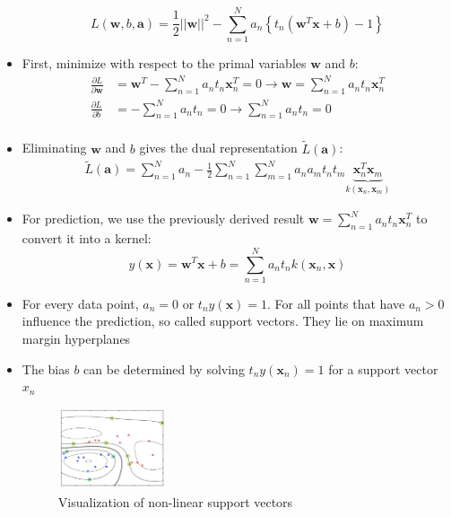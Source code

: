 \begin{itemize}
	$$L\left(\bm{w},b,\bm{a}\right) = \frac{1}{2}||\bm{w}||^2 - \sum\limits_{n=1}^{N} a_n \left\{t_n \left(\bm{w}^T \bm{x} + b\right) - 1\right\}$$
	\item First, minimize with respect to the primal variables $\bm{w}$ and $b$:
	\begin{equation*}
		\begin{split}
			\frac{\partial L}{\partial \bm{w}} & = \bm{w}^T - \sum\limits_{n=1}^{N} a_n t_n \bm{x}_n^T = 0\to \bm{w} = \sum\limits_{n=1}^{N}a_n t_n \bm{x}_n^T\\
			\frac{\partial L}{\partial b} & = - \sum\limits_{n=1}^{N} a_n t_n = 0\to \sum\limits_{n=1}^{N} a_n t_n = 0\\
		\end{split}
	\end{equation*}
	\item Eliminating $\bm{w}$ and $b$ gives the dual representation $\tilde{L}(\bm{a})$:
	\begin{equation*}
		\begin{split}
			\tilde{L}(\bm{a}) = \sum\limits_{n=1}^{N} a_n - \frac{1}{2} \sum\limits_{n=1}^{N}\sum\limits_{m=1}^{N} a_n a_m t_n t_m \underbrace{\bm{x}_n^T \bm{x}_m}_{k(\bm{x}_n, \bm{x}_m)}
		\end{split}
	\end{equation*}
	\item For prediction, we use the previously derived result $\bm{w} = \sum_{n=1}^{N}a_n t_n \bm{x}_n^T$ to convert it into a kernel:
	$$y(\bm{x})=\bm{w}^T \bm{x} + b = \sum_{n=1}^{N}a_n t_n k(\bm{x}_n, \bm{x})$$
	\item For every data point, $a_n = 0$ or $t_n y(\bm{x}) = 1$. For all points that have $a_n > 0$ influence the prediction, so called support vectors. They lie on maximum margin hyperplanes 
	\item The bias $b$ can be determined by solving $t_n y(\bm{x}_n) = 1$ for a support vector $x_n$
	\begin{figure}[ht]
		\centering
		\includegraphics[width=0.3\textwidth]{figures/svm_support_vectors.png}
		\caption{Visualization of non-linear support vectors}
		\label{img:svm_support_vectors}
	\end{figure}
\end{itemize}
